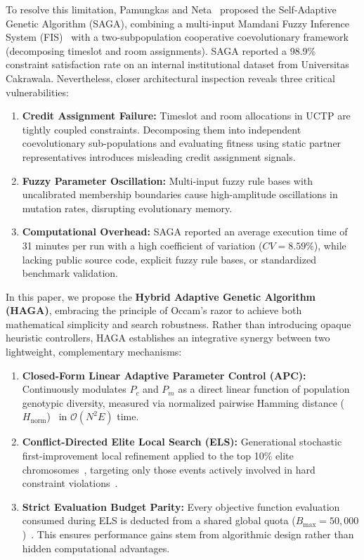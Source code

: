 \documentclass[journal]{IEEEtran}
\begin{document}
To resolve this limitation, Pamungkas and Neta~\cite{pamungkas2025saga} proposed the Self-Adaptive Genetic Algorithm (SAGA), combining a multi-input Mamdani Fuzzy Inference System (FIS)~\cite{herrera2003fuzzy} with a two-subpopulation cooperative coevolutionary framework (decomposing timeslot and room assignments). SAGA reported a 98.9\% constraint satisfaction rate on an internal institutional dataset from Universitas Cakrawala. Nevertheless, closer architectural inspection reveals three critical vulnerabilities:
\begin{enumerate}
    \item \textbf{Credit Assignment Failure:} Timeslot and room allocations in UCTP are tightly coupled constraints. Decomposing them into independent coevolutionary sub-populations and evaluating fitness using static partner representatives introduces misleading credit assignment signals.
    \item \textbf{Fuzzy Parameter Oscillation:} Multi-input fuzzy rule bases with uncalibrated membership boundaries cause high-amplitude oscillations in mutation rates, disrupting evolutionary memory.
    \item \textbf{Computational Overhead:} SAGA reported an average execution time of 31 minutes per run with a high coefficient of variation ($CV = 8.59\%$), while lacking public source code, explicit fuzzy rule bases, or standardized benchmark validation.
\end{enumerate}

In this paper, we propose the \textbf{Hybrid Adaptive Genetic Algorithm (HAGA)}, embracing the principle of Occam's razor to achieve both mathematical simplicity and search robustness. Rather than introducing opaque heuristic controllers, HAGA establishes an integrative synergy between two lightweight, complementary mechanisms:
\begin{enumerate}
    \item \textbf{Closed-Form Linear Adaptive Parameter Control (APC):} Continuously modulates $P_c$ and $P_m$ as a direct linear function of population genotypic diversity, measured via normalized pairwise Hamming distance ($H_{\text{norm}}$)~\cite{sakal2023genotype} in $\mathcal{O}(N^2 E)$ time.
    \item \textbf{Conflict-Directed Elite Local Search (ELS):} Generational stochastic first-improvement local refinement applied to the top 10\% elite chromosomes~\cite{kurniawan2025elite}, targeting only those events actively involved in hard constraint violations~\cite{song2021competition}.
    \item \textbf{Strict Evaluation Budget Parity:} Every objective function evaluation consumed during ELS is deducted from a shared global quota ($B_{\max} = 50,000$)~\cite{hassan2005comparison,ponnambalam2001comparative}. This ensures performance gains stem from algorithmic design rather than hidden computational advantages.
\end{enumerate}
\end{document}
